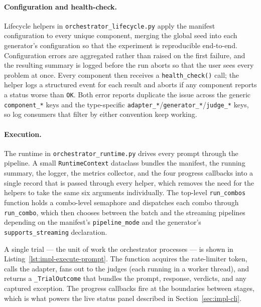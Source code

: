 \paragraph{Configuration and health-check.}
Lifecycle helpers in \texttt{orchestrator\_lifecycle.py} apply the manifest configuration to every unique component, merging the global seed into each generator's configuration so that the experiment is reproducible end-to-end.
Configuration errors are aggregated rather than raised on the first failure, and the resulting summary is logged before the run aborts so that the user sees every problem at once.
Every component then receives a \texttt{health\_check()} call; the helper logs a structured event for each result and aborts if any component reports a status worse than \texttt{OK}.
Both error reports duplicate the issue across the generic \texttt{component\_*} keys and the type-specific \texttt{adapter\_*}/\texttt{generator\_*}/\texttt{judge\_*} keys, so log consumers that filter by either convention keep working.

\paragraph{Execution.}
The runtime in \texttt{orchestrator\_runtime.py} drives every prompt through the pipeline.
A small \texttt{RuntimeContext} dataclass bundles the manifest, the running summary, the logger, the metrics collector, and the four progress callbacks into a single record that is passed through every helper, which removes the need for the helpers to take the same six arguments individually.
The top-level \texttt{run\_combos} function holds a combo-level semaphore and dispatches each combo through \texttt{run\_combo}, which then chooses between the batch and the streaming pipelines depending on the manifest's \texttt{pipeline\_mode} and the generator's \texttt{supports\_streaming} declaration.

A single trial --- the unit of work the orchestrator processes --- is shown in Listing~\ref{lst:impl-execute-prompt}.
The function acquires the rate-limiter token, calls the adapter, fans out to the judges (each running in a worker thread), and returns a \texttt{\_TrialOutcome} that bundles the prompt, response, verdicts, and any captured exception.
The progress callbacks fire at the boundaries between stages, which is what powers the live status panel described in Section~\ref{sec:impl-cli}.


